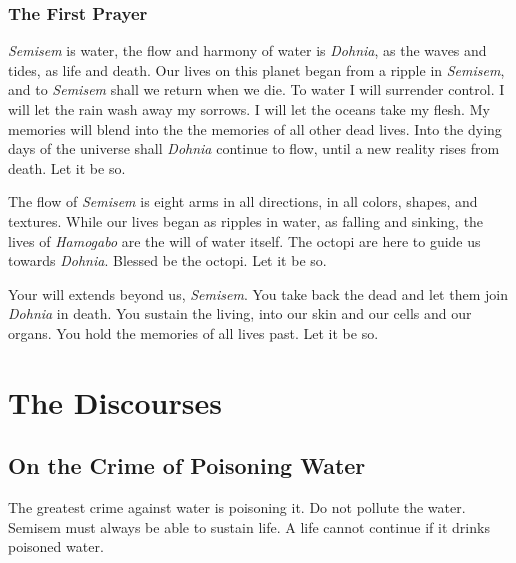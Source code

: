 \documentclass[12pt, letterpaper]{report}
\begin{document}
\section{The First Prayer}

\begin{poem}
\begin{stanza}
\textit{Semisem} is water,\verseline
the flow and harmony of water is \textit{Dohnia},\verseline
as the waves and tides, as life and death.\verseline
Our lives on this planet began from a ripple in \textit{Semisem},\verseline
and to \textit{Semisem} shall we return when we die.\verseline
To water I will surrender control.\verseline
I will let the rain wash away my sorrows.\verseline
I will let the oceans take my flesh.\verseline
My memories will blend into the the memories of all other dead lives.\verseline
Into the dying days of the universe shall \textit{Dohnia} continue to flow,\verseline
until a new reality rises from death.\verseline
Let it be so.
\end{stanza}
\begin{stanza}
The flow of \textit{Semisem} is eight arms in all directions,\verseline
in all colors, shapes, and textures.\verseline
While our lives began as ripples in water, as falling and sinking,\verseline
the lives of \textit{Hamogabo} are the will of water itself.\verseline
The octopi are here to guide us towards \textit{Dohnia}.\verseline
Blessed be the octopi.\verseline
Let it be so.
\end{stanza}
\begin{stanza}
Your will extends beyond us, \textit{Semisem}.\verseline
You take back the dead and let them join \textit{Dohnia} in death.\verseline
You sustain the living, into our skin and our cells and our organs.\verseline
You hold the memories of all lives past.\verseline
Let it be so.
\end{stanza}
\end{poem}

\part{The Discourses}

\chapter{On the Crime of Poisoning Water}

The greatest crime against water is poisoning it. Do not pollute the water. Semisem must always be able to sustain life. A life cannot continue if it drinks poisoned water. 
\end{document}
